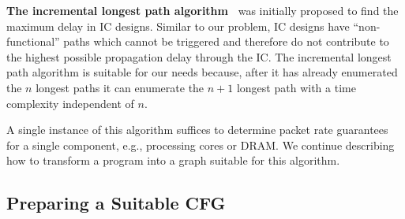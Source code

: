 \documentclass[sigconf,screen,authordraft]{acmart}
\newcommand{\eg}{e.g.,}
\begin{document}
\noindent\textbf{The incremental longest path algorithm~\cite{kundu94}} was initially proposed to find the maximum delay in \ac{IC} designs.
Similar to our problem, \ac{IC} designs have ``non-functional'' paths which cannot be triggered and therefore do not contribute to the highest possible propagation delay through the \ac{IC}.
The incremental longest path algorithm is suitable for our needs because, after it has already enumerated the $n$ longest paths it can enumerate the $n+1$ longest path with a time complexity independent of $n$.

A single instance of this algorithm suffices to determine packet rate guarantees for a single component, \eg{} processing cores or DRAM.
We continue describing how to transform a program into a graph suitable for this algorithm.


\subsection{Preparing a Suitable \acs{CFG}}
\label{subsec:cfg-preprocessing}
\end{document}
